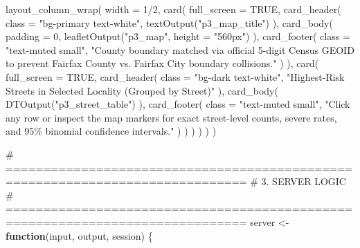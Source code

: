 \documentclass[
  letterpaper,
  DIV=11,
  numbers=noendperiod]{scrartcl}
\newenvironment{Shaded}{\begin{snugshade}}{\end{snugshade}}
\newcommand{\AttributeTok}[1]{\textcolor[rgb]{0.40,0.45,0.13}{#1}}
\newcommand{\CommentTok}[1]{\textcolor[rgb]{0.37,0.37,0.37}{#1}}
\newcommand{\ConstantTok}[1]{\textcolor[rgb]{0.56,0.35,0.01}{#1}}
\newcommand{\ControlFlowTok}[1]{\textcolor[rgb]{0.00,0.23,0.31}{\textbf{#1}}}
\newcommand{\DecValTok}[1]{\textcolor[rgb]{0.68,0.00,0.00}{#1}}
\newcommand{\FunctionTok}[1]{\textcolor[rgb]{0.28,0.35,0.67}{#1}}
\newcommand{\NormalTok}[1]{\textcolor[rgb]{0.00,0.23,0.31}{#1}}
\newcommand{\OtherTok}[1]{\textcolor[rgb]{0.00,0.23,0.31}{#1}}
\newcommand{\SpecialCharTok}[1]{\textcolor[rgb]{0.37,0.37,0.37}{#1}}
\newcommand{\StringTok}[1]{\textcolor[rgb]{0.13,0.47,0.30}{#1}}
\begin{document}
\begin{Shaded}
\begin{Highlighting}[]
      \FunctionTok{layout\_column\_wrap}\NormalTok{(}
        \AttributeTok{width =} \DecValTok{1}\SpecialCharTok{/}\DecValTok{2}\NormalTok{,}
        \FunctionTok{card}\NormalTok{(}
          \AttributeTok{full\_screen =} \ConstantTok{TRUE}\NormalTok{,}
          \FunctionTok{card\_header}\NormalTok{(}
            \AttributeTok{class =} \StringTok{"bg{-}primary text{-}white"}\NormalTok{,}
            \FunctionTok{textOutput}\NormalTok{(}\StringTok{"p3\_map\_title"}\NormalTok{)}
\NormalTok{          ),}
          \FunctionTok{card\_body}\NormalTok{(}
            \AttributeTok{padding =} \DecValTok{0}\NormalTok{,}
            \FunctionTok{leafletOutput}\NormalTok{(}\StringTok{"p3\_map"}\NormalTok{, }\AttributeTok{height =} \StringTok{"560px"}\NormalTok{)}
\NormalTok{          ),}
          \FunctionTok{card\_footer}\NormalTok{(}
            \AttributeTok{class =} \StringTok{"text{-}muted small"}\NormalTok{,}
            \StringTok{"County boundary matched via official 5{-}digit Census GEOID to prevent Fairfax County vs. Fairfax City boundary collisions."}
\NormalTok{          )}
\NormalTok{        ),}
        \FunctionTok{card}\NormalTok{(}
          \AttributeTok{full\_screen =} \ConstantTok{TRUE}\NormalTok{,}
          \FunctionTok{card\_header}\NormalTok{(}
            \AttributeTok{class =} \StringTok{"bg{-}dark text{-}white"}\NormalTok{,}
            \StringTok{"Highest{-}Risk Streets in Selected Locality (Grouped by Street)"}
\NormalTok{          ),}
          \FunctionTok{card\_body}\NormalTok{(}
            \FunctionTok{DTOutput}\NormalTok{(}\StringTok{"p3\_street\_table"}\NormalTok{)}
\NormalTok{          ),}
          \FunctionTok{card\_footer}\NormalTok{(}
            \AttributeTok{class =} \StringTok{"text{-}muted small"}\NormalTok{,}
            \StringTok{"Click any row or inspect the map markers for exact street{-}level counts, severe rates, and 95\% binomial confidence intervals."}
\NormalTok{          )}
\NormalTok{        )}
\NormalTok{      )}
\NormalTok{    )}
\NormalTok{  )}
\NormalTok{)}

\CommentTok{\# ==============================================================================}
\CommentTok{\# 3. SERVER LOGIC}
\CommentTok{\# ==============================================================================}
\NormalTok{server }\OtherTok{\textless{}{-}} \ControlFlowTok{function}\NormalTok{(input, output, session) \{}


\end{Highlighting}
\end{Shaded}
\end{document}
